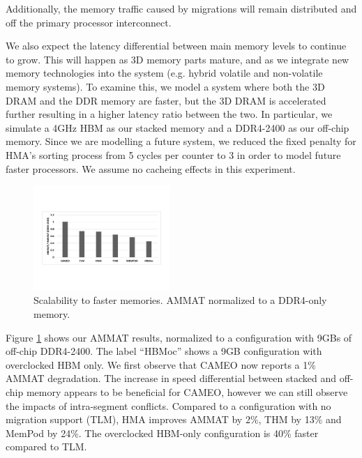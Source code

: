 Additionally, the memory traffic caused by migrations will remain distributed
and off the primary processor interconnect.

We also expect the latency differential between main memory levels to 
continue to grow.  This will happen as 3D memory parts mature, and as
we integrate new memory technologies into the system (e.g. hybrid
volatile and non-volatile memory systems).
To examine this, we model a system where both the 3D DRAM and the DDR memory
are faster, but the 3D DRAM is accelerated further resulting in a higher
latency ratio between the two. 
In particular, we simulate a 4GHz HBM as our stacked memory and a DDR4-2400 as our off-chip memory. Since we are modelling a future system, we reduced the fixed penalty for HMA's sorting process from 5 cycles per counter to 3 in order to model future faster processors.
We assume no cacheing effects in this experiment.

\begin{figure}[h]
  \includegraphics[width=0.46\textwidth]{figures/revised/new/scalability_speed.pdf}
  \caption{Scalability to faster memories. AMMAT normalized to a DDR4-only memory.}
  \label{fig:scalability}
\end{figure}

Figure \ref{fig:scalability} shows our AMMAT results, normalized to a configuration with 9GBs of off-chip DDR4-2400. The label ``HBMoc'' shows a 9GB configuration with overclocked HBM only. We first observe that CAMEO now reports a 1\% AMMAT degradation. The increase in speed differential between stacked and off-chip memory appears to be beneficial for CAMEO, however we can still observe the impacts of intra-segment conflicts. Compared to a configuration with no migration support (TLM), HMA improves AMMAT by 2\%, THM by 13\% and MemPod by 24\%. The overclocked HBM-only configuration is 40\% faster compared to TLM.


